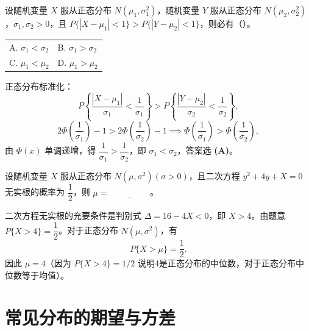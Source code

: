 \documentclass[lang=cn,11pt]{elegantbook}
\begin{document}
\begin{exercise}[正态分布标准差比较] \label{exer:2-34}
设随机变量 $X$ 服从正态分布 $N(\mu_1,\sigma_1^2)$，随机变量 $Y$ 服从正态分布 $N(\mu_2,\sigma_2^2)$，$\sigma_1,\sigma_2>0$，且 $P\{|X-\mu_1|<1\}>P\{|Y-\mu_2|<1\}$，则必有（\quad）。
\begin{tabular}{ll}
A. $\sigma_1<\sigma_2$ & B. $\sigma_1>\sigma_2$ \\
C. $\mu_1<\mu_2$ & D. $\mu_1>\mu_2$
\end{tabular}
\end{exercise}
\begin{solution}
正态分布标准化：
\[
P\left\{\frac{|X-\mu_1|}{\sigma_1}<\frac{1}{\sigma_1}\right\}>P\left\{\frac{|Y-\mu_2|}{\sigma_2}<\frac{1}{\sigma_2}\right\},
\]
\[
2\Phi\left(\frac{1}{\sigma_1}\right)-1 > 2\Phi\left(\frac{1}{\sigma_2}\right)-1 \implies \Phi\left(\frac{1}{\sigma_1}\right)>\Phi\left(\frac{1}{\sigma_2}\right),
\]
由 $\Phi(x)$ 单调递增，得 $\dfrac{1}{\sigma_1}>\dfrac{1}{\sigma_2}$，即 $\sigma_1<\sigma_2$，答案选 \textbf{(A)}。
\end{solution}


\begin{exercise}[正态分布参数求解] \label{exer:2-39}
设随机变量 $X$ 服从正态分布 $N(\mu,\sigma^2)(\sigma>0)$，且二次方程 $y^2+4y+X=0$ 无实根的概率为 $\dfrac{1}{2}$，则 $\mu=\underline{\hspace{2cm}}$。
\end{exercise}

\begin{solution}
二次方程无实根的充要条件是判别式 $\Delta = 16-4X < 0$，即 $X>4$。由题意 $P\{X>4\}=\dfrac{1}{2}$。对于正态分布 $N(\mu,\sigma^2)$，有
\[
P\{X>\mu\} = \frac{1}{2}.
\]
因此 $\mu=4$（因为 $P\{X>4\}=1/2$ 说明4是正态分布的中位数，对于正态分布中位数等于均值）。
\end{solution}

\section{常见分布的期望与方差}
\end{document}
